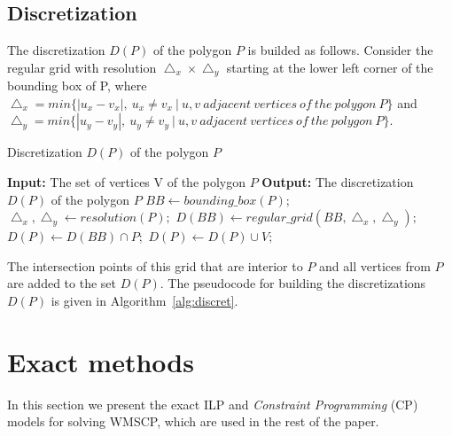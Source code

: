 \documentclass[runningheads,a4paper]{elsarticle}
\begin{document}
	
	\subsection{Discretization}  
	The discretization $D(P)$ of the polygon $P$ is builded as follows. Consider the regular grid with resolution $\bigtriangleup_{x}\times\bigtriangleup_{y}$ starting at the lower left corner of the bounding box of P, where \\
$ \bigtriangleup_{x}=min\{ |u_{x}-v_{x}|,\ u_{x}\neq v_{x}\ |\  u,v\ adjacent\ vertices\ of\ the\ polygon\ P \}$ and\\
$ \bigtriangleup_{y}=min\{ |u_{y}-v_{y}|,\ u_{y}\neq v_{y}\ |\  u,v\ adjacent\ vertices\ of\ the\ polygon\ P \}$. 
	
	\begin{algorithm}[!t]
		\caption{Discretization $D(P)$ of the polygon $P$}\label{alg:discret}
		\begin{algorithmic}[1]
			\State \textbf{Input:} The set of vertices V of the polygon $P$
			\State \textbf{Output:} The discretization $D(P)$ of the polygon $P$
			\State $BB \gets bounding\_box(P);$
			\State $\bigtriangleup_{x},\bigtriangleup_{y} \gets resolution(P);$
			\State $D(BB) \gets regular\_grid(BB,\bigtriangleup_{x},\bigtriangleup_{y});$
			\State $D(P) \gets D(BB) \cap P;$
			\State $D(P) \gets D(P) \cup V;$
		\end{algorithmic}
	\end{algorithm}
	
	
	The intersection points of this grid that are interior to $P$ and all vertices from $P$ are added to the set $D(P)$. The pseudocode for building the discretizations $D(P)$ is given in Algorithm~\ref{alg:discret}.
	
	
	\section{Exact methods}
	In this section we present the exact ILP and \emph{Constraint Programming} (CP) models for solving WMSCP, which are used  in the rest of the paper.
\end{document}

